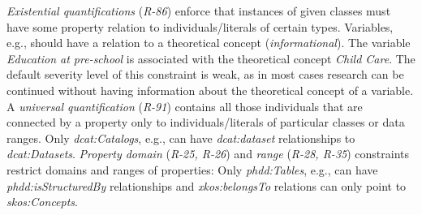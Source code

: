 \documentclass{llncs}
\newenvironment{DL}{
  \small
  \vspace{0cm}
	\begin{center}
  \begin{tabular}{c l}

}{
  \end{tabular}
	\end{center}
}
\begin{document}
\emph{Existential quantifications} (\emph{R-86}) enforce that instances of given classes must have some property relation to individuals/literals of certain types.
Variables, e.g., should have a relation to a theoretical concept (\emph{informational}).
The variable \emph{Education at pre-school} is associated with the theoretical concept \emph{Child Care}. 
The default severity level of this constraint is weak, as in most cases research can be continued without having information about the theoretical concept of a variable.
A \emph{universal quantification} (\emph{R-91}) contains all those individuals that are connected by a property only to individuals/literals of particular classes  or data ranges.
Only \emph{dcat:Catalogs}, e.g., can have \emph{dcat:dataset} relationships to \emph{dcat:Datasets}.
\emph{Property domain} (\emph{R-25, R-26}) and \emph{range} (\emph{R-28, R-35}) constraints restrict domains and ranges of properties:
Only \emph{phdd:Tables}, e.g., can have \emph{phdd:isStructuredBy} relationships and
\emph{xkos:belongsTo} relations can only point to \emph{skos:Concepts}.
\end{document}
